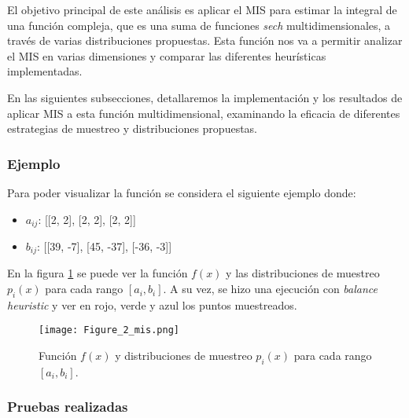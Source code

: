 \documentclass{article}
\begin{document}
El objetivo principal de este análisis es aplicar el MIS para estimar la integral de una función compleja, que es una suma de funciones \textit{sech} multidimensionales, a través de varias distribuciones propuestas.
Esta función nos va a permitir analizar el MIS en varias dimensiones y comparar las diferentes heurísticas implementadas.

En las siguientes subsecciones, detallaremos la implementación y los resultados de aplicar MIS a esta función multidimensional, examinando la eficacia de diferentes estrategias de muestreo y distribuciones propuestas.

\subsubsection{Ejemplo}

Para poder visualizar la función se considera el siguiente ejemplo donde:

\begin{itemize}
    \item \textbf{\( a_{ij} \)}: [[2, 2], [2, 2], [2, 2]]
    \item \textbf{\( b_{ij} \)}: [[39, -7], [45, -37], [-36, -3]]
\end{itemize}

En la figura \ref{fig:mis2} se puede ver la función \( f(x) \) y las distribuciones de muestreo \( p_{i}(x) \) para cada rango \( [a_{i}, b_{i}] \).
A su vez, se hizo una ejecución con \textit{balance heuristic} y ver en rojo, verde y azul los puntos muestreados.

\begin{figure}[H]
\texttt{[image: Figure\_2\_mis.png]}
\caption{Función \( f(x) \) y distribuciones de muestreo \( p_{i}(x) \) para cada rango \( [a_{i}, b_{i}] \).}
\label{fig:mis2}
\end{figure}

\subsubsection{Pruebas realizadas}
\end{document}
